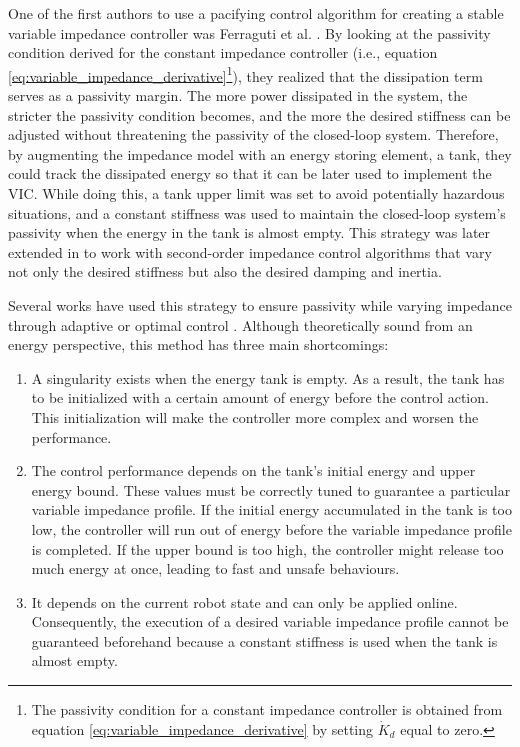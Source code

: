 One of the first authors to use a pacifying control algorithm for creating a stable variable impedance controller was Ferraguti et al. \cite{ferragutiTankbasedApproachImpedance2013}. By looking at the passivity condition derived for the constant impedance controller (i.e., equation \eqref{eq:variable_impedance_derivative}\footnote{The passivity condition for a constant impedance controller is obtained from equation \eqref{eq:variable_impedance_derivative} by setting $\dot{K}_d$ equal to zero.}), they realized that the dissipation term serves as a passivity margin. The more power dissipated in the system, the stricter the passivity condition becomes, and the more the desired stiffness can be adjusted without threatening the passivity of the closed-loop system. Therefore, by augmenting the impedance model with an energy storing element, a tank, they could track the dissipated energy so that it can be later used to implement the VIC. While doing this, a tank upper limit was set to avoid potentially hazardous situations, and a constant stiffness was used to maintain the closed-loop system's passivity when the energy in the tank is almost empty. This strategy was later extended in \cite{ferragutiEnergyTankBasedInteractive2015} to work with second-order impedance control algorithms that vary not only the desired stiffness but also the desired damping and inertia.

Several works have used this strategy to ensure passivity while varying impedance through adaptive or optimal control \cite{cordoniVariableStochasticAdmittance2020,dietrichPassivationProjectionBasedNull2016,dietrichPassiveHierarchicalImpedance2017,michelPassivitybasedVariableImpedance2020,chenDrawingElonMusk2021,balattiMethodAutonomousRobotic2020,scibiliaSelfAdaptiveRobotControl2018,selvaggioPassiveVirtualFixtures2018,tadeleCombiningEnergyPower2014}. Although theoretically sound from an energy perspective, this method has three main shortcomings:
\begin{enumerate}
    \item A singularity exists when the energy tank is empty. As a result, the tank has to be initialized with a certain amount of energy before the control action. This initialization will make the controller more complex and worsen the performance.
    \item The control performance depends on the tank's initial energy and upper energy bound. These values must be correctly tuned to guarantee a particular variable impedance profile. If the initial energy accumulated in the tank is too low, the controller will run out of energy before the variable impedance profile is completed. If the upper bound is too high, the controller might release too much energy at once, leading to fast and unsafe behaviours.
    \item It depends on the current robot state and can only be applied online. Consequently, the execution of a desired variable impedance profile cannot be guaranteed beforehand because a constant stiffness is used when the tank is almost empty.
\end{enumerate}

